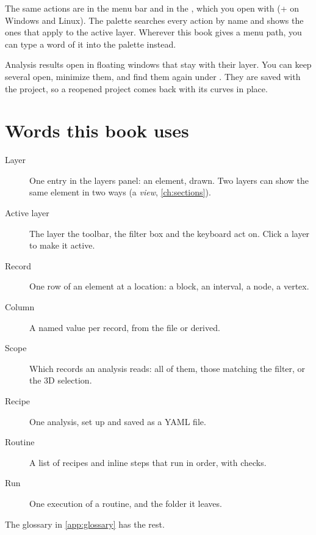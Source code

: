 The same actions are in the menu bar and in the , which you open with  (+ on Windows and Linux). The palette searches every action by name and shows the ones that apply to the active layer. Wherever this book gives a menu path, you can type a word of it into the palette instead.

Analysis results open in floating windows that stay with their layer. You can keep several open, minimize them, and find them again under . They are saved with the project, so a reopened project comes back with its curves in place.

\section{Words this book uses}\label{sec:micro-words}
\begin{description}
\item[Layer] One entry in the layers panel: an element, drawn. Two layers can show the same element in two ways (a \emph{view}, \cref{ch:sections}).
\item[Active layer] The layer the toolbar, the filter box and the keyboard act on. Click a layer to make it active.
\item[Record] One row of an element at a location: a block, an interval, a node, a vertex.
\item[Column] A named value per record, from the file or derived.
\item[Scope] Which records an analysis reads: all of them, those matching the filter, or the 3D selection.
\item[Recipe] One analysis, set up and saved as a YAML file.
\item[Routine] A list of recipes and inline steps that run in order, with checks.
\item[Run] One execution of a routine, and the folder it leaves.
\end{description}

The glossary in \cref{app:glossary} has the rest.
